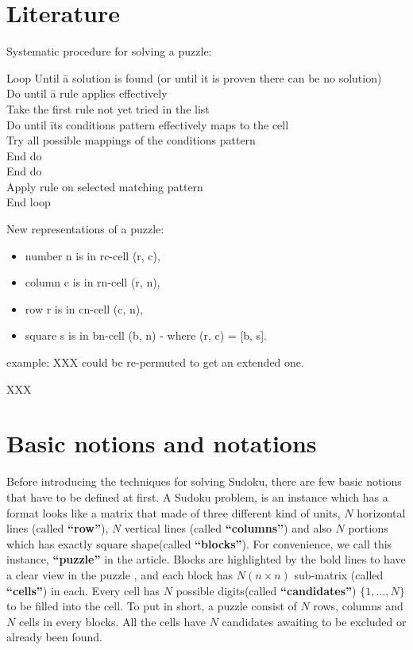 \documentclass[11pt]{report}
\begin{document}
\section{Literature}
\label{sec:introLiterature}

Systematic procedure for solving a puzzle:
\begin{tabbing}
Loop Until \= a solution is found (or until it is proven there can be no solution) \\
\> Do until \= a rule applies  effectively \\
\> \> Take the first rule not yet tried in the list \\
\> \> Do until \= its conditions pattern effectively maps to the cell \\
\> \> \> Try all possible mappings of the conditions pattern \\
\> \> End do\\
\> End do\\
\> Apply rule on selected matching pattern \\
End loop\\
\end{tabbing}

New representations of a puzzle:
\begin{itemize}
\item number n is in rc-cell (r, c),
\item column c is in rn-cell (r, n),
\item row r is in cn-cell (c, n),
\item square s is in bn-cell (b, n) - where (r, c) = [b, s].
\end{itemize}

example: XXX could be re-permuted to get an extended one.

\cite{Berthier2007Sudoku} XXX





\section{Basic notions and notations}
\label{sec:basicnotnotat}

Before introducing the techniques for solving Sudoku, there are few basic notions that have to be defined at first. A Sudoku problem, is an instance which has a format looks like a matrix that made of three different kind of units, $N$ horizontal lines (called \textbf{``row''}), $N$ vertical lines (called \textbf{``columns''}) and also $N$ portions which has exactly square shape(called  \textbf{``blocks''}). For convenience, we call this instance, \textbf{``puzzle''} in the article. Blocks are highlighted by the bold lines to have a clear view in the puzzle , and each block has $N (n \times n)$ sub-matrix (called \textbf{``cells''}) in each. Every cell has $N$ possible digits(called \textbf{``candidates''}) $\{1, \dots, N\}$ to be filled into the cell. To put in short, a puzzle consist of $N$ rows, columns and $N$ cells in every blocks. All the cells have $N$ candidates awaiting to be excluded or already been found.
\end{document}
